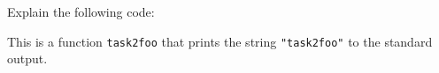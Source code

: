 Explain the following code:



\begin{solution}
    This is a function \lstinline{task2foo}
    that prints the string \lstinline{"task2foo"} to the standard output.
\end{solution}
